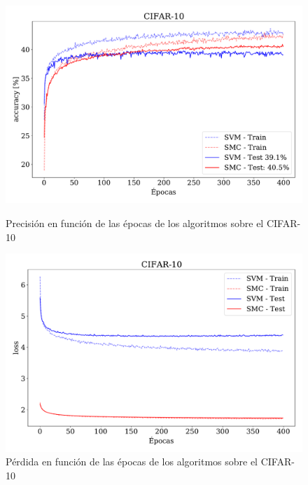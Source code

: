 \begin{figure}[H]
    \centering
    \begin{minipage}{.485\textwidth}
        \centering
        \includegraphics[width=\linewidth]{plots/ejer_5_CIFAR-10_acc.pdf}
        \caption{Precisión en función de las épocas de los algoritmos sobre el CIFAR-10}
        \label{fig:ejer5_cifar10_acc}
    \end{minipage}%
    \hfill
    \begin{minipage}{.485\textwidth}
        \centering
        \includegraphics[width=\linewidth]{plots/ejer_5_CIFAR-10_los.pdf}
        \caption{Pérdida en función de las épocas de los algoritmos sobre el CIFAR-10}
        \label{fig:ejer5_cifar10_loss}
    \end{minipage}
    \end{figure}
    

